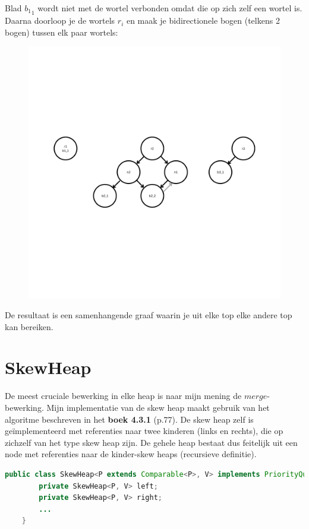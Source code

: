\documentclass[12pt,a4paper,fleqn]{report}
\begin{document}
	Blad ${b_1}_1$ wordt niet met de wortel verbonden omdat die op zich zelf een wortel is.
	Daarna doorloop je de wortels $r_i$ en maak je bidirectionele bogen (telkens 2 bogen)
	tussen elk paar wortels:

	\begin{figure}[htbp]
		\centering
		\includegraphics[page=3, trim=0cm 10.25cm 0cm 10.25cm, clip, width=1.00\textwidth]	{assets/coherent_graph.pdf}
	\end{figure}

	De resultaat is een samenhangende graaf waarin je uit elke top elke andere top
	kan bereiken.
\pagebreak

	\chapter{SkewHeap}
	De meest cruciale bewerking in elke heap is naar mijn mening de $merge$-bewerking. Mijn
	implementatie van de skew heap maakt gebruik van het algoritme beschreven in het
	\textbf{boek 4.3.1} (p.77). De skew heap zelf is geïmplementeerd met referenties naar
	twee kinderen (links en rechts), die op zichzelf van het type skew heap zijn. De gehele
	heap bestaat dus feitelijk uit een node met referenties naar de kinder-skew heaps
	(recursieve definitie).

	\begin{lstlisting}[language=Java]
	public class SkewHeap<P extends Comparable<P>, V> implements PriorityQueue<P, V> {
		private SkewHeap<P, V> left;
		private SkewHeap<P, V> right;
		...
	}
\end{lstlisting}
\end{document}
